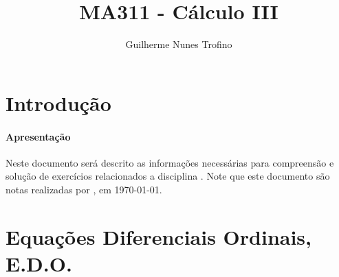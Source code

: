 \documentclass{article}
\title{MA311 - Cálculo III}
\author{Guilherme Nunes Trofino}
\begin{document}
    \maketitle
\newpage

    \tableofcontents
\newpage

    \section{Introdução}
        \paragraph{Apresentação}Neste documento será descrito as informações necessárias para compreensão e solução de exercícios relacionados a disciplina \thetitle . Note que este documento são notas realizadas por \theauthor , em \today.

    \section{Equações Diferenciais Ordinais, E.D.O.}
\end{document}
